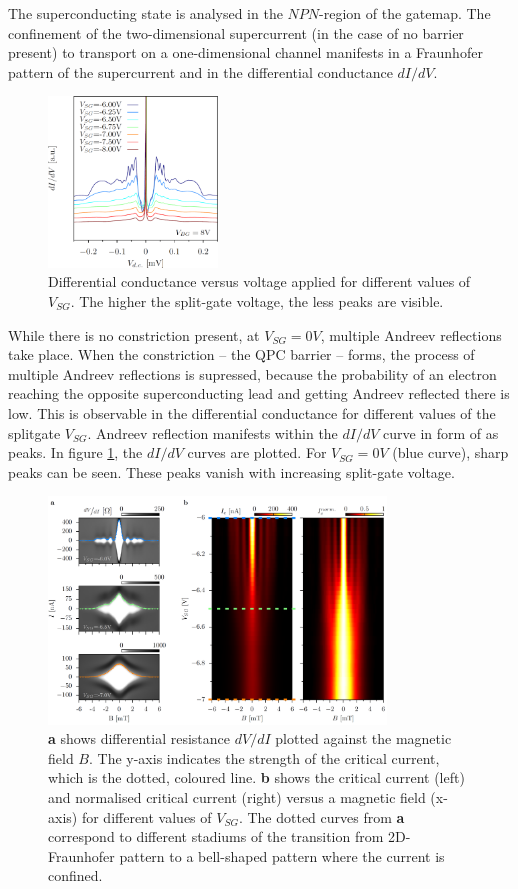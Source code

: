 The superconducting state is analysed in the $NPN$-region of the gatemap. The confinement of the two-dimensional supercurrent (in the case of no barrier present) to transport on a one-dimensional channel manifests in a Fraunhofer pattern of the supercurrent and in the differential conductance $dI/dV$. 
\begin{figure}
\centering
\includegraphics[width=0.4\textwidth]{figure/experiment/mar}
\caption{Differential conductance versus voltage applied for different values of $V_{SG}$. The higher the split-gate voltage, the less peaks are visible.}\label{fig:mar}
\end{figure}
While there is no constriction present, at $V_{SG} = 0 V$, multiple Andreev reflections take place. When the constriction -- the QPC barrier -- forms, the process of multiple Andreev reflections is supressed, because the probability of an electron reaching the opposite superconducting lead and getting Andreev reflected there is low. This is observable in the differential conductance for different values of the splitgate $V_{SG}$. Andreev reflection manifests within the $dI/dV$ curve in form of as peaks. In figure \ref{fig:mar}, the $dI/dV$ curves are plotted. For $V_{SG} = 0 V$ (blue curve), sharp peaks can be seen. These peaks vanish with increasing split-gate voltage.
\begin{figure}
\centering
\includegraphics[width=0.8\textwidth]{figure/experiment/supercurrent}
\caption{\textbf{a} shows differential resistance $dV/dI$ plotted against the magnetic field $B$. The y-axis indicates the strength of the critical current, which is the dotted, coloured line. \textbf{b} shows the critical current (left) and normalised critical current (right) versus a magnetic field (x-axis) for different values of $V_{SG}$. The dotted curves from \textbf{a} correspond to different stadiums of the transition from 2D-Fraunhofer pattern to a bell-shaped pattern where the current is confined.}\label{fig:supercurrent}
\end{figure}
